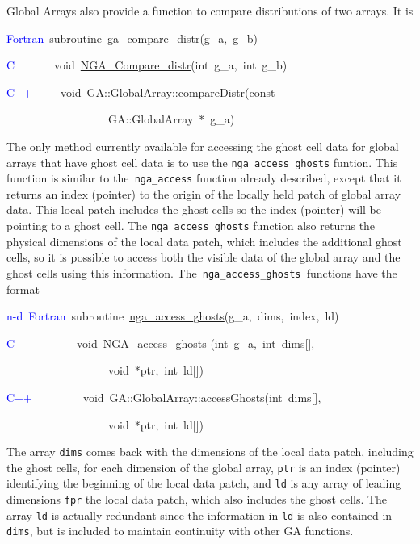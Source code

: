 Global Arrays also provide a function to compare distributions of
two arrays. It is

\textcolor{blue}{Fortran}~subroutine~\href{https://hpc.pnl.gov/globalarrays/api/f_op_api.html\#ga_compare_distr}{ga\_{}compare\_{}distr}(g\_a,~g\_b)

\textcolor{blue}{C}~~~~~~~void~\href{https://hpc.pnl.gov/globalarrays/api/c_op_api.html\#ga_compare_distr}{NGA\_{}Compare\_{}distr}(int~g\_a,~int~g\_b)~

\textcolor{blue}{C++}~~~~~void~GA::GlobalArray::compareDistr(const~

~~~~~~~~~~~~~~~~~~GA::GlobalArray~{*}~g\_a)

The only method currently available for accessing the ghost cell data
for global arrays that have ghost cell data is to use the \texttt{nga\_access\_ghosts}
funtion. This function is similar to the\texttt{ nga\_access} function
already described, except that it returns an index (pointer) to the
origin of the locally held patch of global array data. This local
patch includes the ghost cells so the index (pointer) will be pointing
to a ghost cell. The \texttt{nga\_access\_ghosts} function also returns
the physical dimensions of the local data patch, which includes the
additional ghost cells, so it is possible to access both the visible
data of the global array and the ghost cells using this information.
The\texttt{ nga\_access\_ghosts }functions have the format

\textcolor{blue}{n-d~Fortran}~subroutine~\href{https://hpc.pnl.gov/globalarrays/api/f_op_api.html\#ga_access_ghosts}{nga\_{}access\_{}ghosts}(g\_a,~dims,~index,~ld)~

\textcolor{blue}{C}~~~~~~~~~~~void~\href{https://hpc.pnl.gov/globalarrays/api/c_op_api.html\#nga_access_ghosts}{NGA\_{}access\_{}ghosts }(int~g\_a,~int~dims{[}{]},~

~~~~~~~~~~~~~~~~~~void~{*}ptr,~int~ld{[}{]})~

\textcolor{blue}{C++~}~~~~~~~~void~GA::GlobalArray::accessGhosts(int~dims{[}{]},

~~~~~~~~~~~~~~~~~~void~{*}ptr,~int~ld{[}{]})~

The array \texttt{dims} comes back with the dimensions of the local
data patch, including the ghost cells, for each dimension of the global
array, \texttt{ptr} is an index (pointer) identifying the beginning
of the local data patch, and \texttt{ld} is any array of leading dimensions
\texttt{fpr} the local data patch, which also includes the ghost cells.
The array \texttt{ld} is actually redundant since the information
in \texttt{ld} is also contained in \texttt{dims}, but is included
to maintain continuity with other GA functions.


